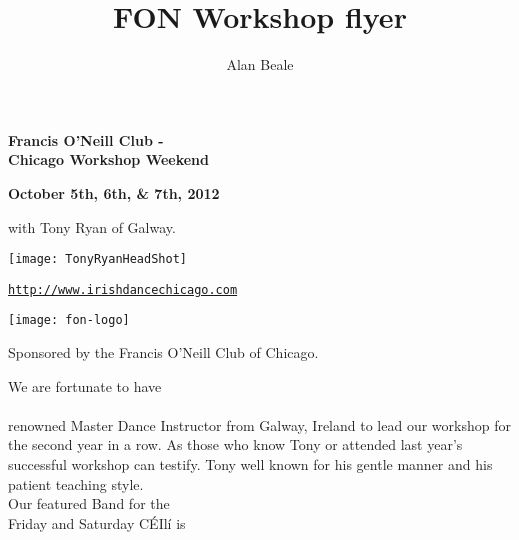 \documentclass[12pt,
letterpaper]{leaflet}
\title{FON Workshop flyer}
\author{Alan Beale}
\date{}
\begin{document}
\begin{center}
{\Large\textbf{Francis O'Neill Club - \\ Chicago Workshop Weekend}}\\ 
\end{center}

\begin{center}
\textbf{October 5th, 6th, \&  7th, 2012} 


\vspace*{0.25em}
with Tony Ryan of Galway.
\end{center}

\vspace*{0.45em}
\begin{center}
\texttt{[image: TonyRyanHeadShot]}
\end{center}

\begin{center}
\vspace*{2em}
{\normalsize \href{http://www.irishdancechicago.com}{\tt http://www.irishdancechicago.com} }

\vspace*{0.45em}
\begin{center}
\texttt{[image: fon-logo]}
\end{center}


{\small Sponsored by the Francis O'Neill Club of Chicago.}
\end{center}


\pagebreak
\begin{center}
We are fortunate to have \\
\\
\vspace*{1em}renowned Master Dance Instructor from Galway, Ireland to
lead our workshop for the second year in a row. As those who know
Tony or attended last year's successful workshop can testify. Tony well
known for his gentle manner and his patient teaching style. \\

\vspace*{4em}
Our featured Band for the \\Friday and Saturday C\'{E}Il\'{i} is \\
\end{center}
\pagebreak
\end{document}
